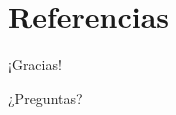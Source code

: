 \documentclass{beamer}
\begin{document}
\section{Referencias}
\begin{frame}[allowframebreaks]
    \nocite{chen-adarank}
    
    
\end{frame}

\begin{frame}
    \begin{center}
        {\Huge ¡Gracias!}

        \vspace{12pt}
        {\large ¿Preguntas?}
    \end{center}
\end{frame}
\end{document}

